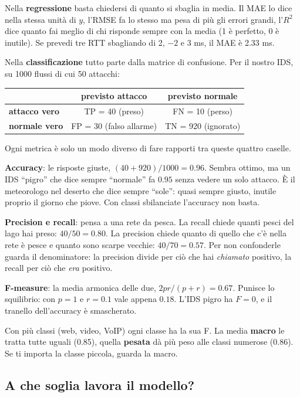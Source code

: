 Nella \textbf{regressione} basta chiedersi di quanto si sbaglia in media. Il MAE lo dice nella stessa unità di $y$, l'RMSE fa lo stesso ma pesa di più gli errori grandi, l'$R^2$ dice quanto fai meglio di chi risponde sempre con la media (1 è perfetto, 0 è inutile). Se prevedi tre RTT sbagliando di 2, $-2$ e 3 ms, il MAE è 2.33 ms.

Nella \textbf{classificazione} tutto parte dalla matrice di confusione. Per il nostro IDS, su 1000 flussi di cui 50 attacchi:
\begin{center}
    \begin{tabular}{l|c|c}
        & \textbf{previsto attacco} & \textbf{previsto normale} \\ \hline
        \textbf{attacco vero} & TP = 40 (preso)          & FN = 10 (perso) \\
        \textbf{normale vero} & FP = 30 (falso allarme)  & TN = 920 (ignorato) \\
    \end{tabular}
\end{center}
Ogni metrica è solo un modo diverso di fare rapporti tra queste quattro caselle.

\textbf{Accuracy}: le risposte giuste, $(40 + 920)/1000 = 0.96$. Sembra ottimo, ma un IDS ``pigro'' che dice sempre ``normale'' fa $0.95$ senza vedere un solo attacco. È il meteorologo nel deserto che dice sempre ``sole'': quasi sempre giusto, inutile proprio il giorno che piove. Con classi sbilanciate l'accuracy non basta.

\textbf{Precision e recall}: pensa a una rete da pesca. La recall chiede quanti pesci del lago hai preso: $40/50 = 0.80$. La precision chiede quanto di quello che c'è nella rete è pesce e quanto sono scarpe vecchie: $40/70 = 0.57$. Per non confonderle guarda il denominatore: la precision divide per ciò che hai \emph{chiamato} positivo, la recall per ciò che \emph{era} positivo.

\textbf{F-measure}: la media armonica delle due, $2pr/(p+r) = 0.67$. Punisce lo squilibrio: con $p = 1$ e $r = 0.1$ vale appena $0.18$. L'IDS pigro ha $F = 0$, e il tranello dell'accuracy è smascherato.

Con più classi (web, video, VoIP) ogni classe ha la sua F. La media \textbf{macro} le tratta tutte uguali (0.85), quella \textbf{pesata} dà più peso alle classi numerose (0.86). Se ti importa la classe piccola, guarda la macro.

\subsection{A che soglia lavora il modello?}
